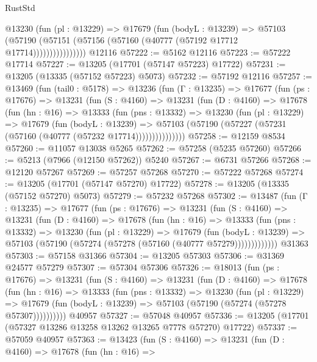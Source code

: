\begin{lexlean}{RustStd}
\begin{coremodule}
                  @13230
                    (fun (pl : @13229) =>
                    @17679
                      (fun (bodyL : @13239) =>
                      @57103
                        (@57190
                          (@57151 (@57156 (@57160 (@40777 (@57192 @17712 @17714))))))))))))))))
    @12116
@57222 := @5162 @12116
@57223 := @57222 @17714
@57227 := @13205 (@17701 (@57147 @57223) @17722)
@57231 := @13205 (@13335 (@57152 @57223) @5073)
@57232 := @57192 @12116
@57257 := @13469
    (fun (tail0 : @5178) =>
    @13236
      (fun (Γ : @13235) =>
      @17677
        (fun (ps : @17676) =>
        @13231
          (fun (S : @4160) =>
          @13231
            (fun (D : @4160) =>
            @17678
              (fun (hn : @16) =>
              @13333
                (fun (pns : @13332) =>
                @13230
                  (fun (pl : @13229) =>
                  @17679
                    (fun (bodyL : @13239) =>
                    @57103 (@57190 (@57227 (@57231 (@57160 (@40777 (@57232 @17714)))))))))))))))
@57258 := @12159 @8534
@57260 := @11057 @13038 @5265
@57262 := @57258 (@5235 @57260)
@57266 := @5213 (@7966 (@12150 @57262)) @5240
@57267 := @6731 @57266
@57268 := @12120 @57267
@57269 := @57257 @57268
@57270 := @57222 @57268
@57274 := @13205 (@17701 (@57147 @57270) @17722)
@57278 := @13205 (@13335 (@57152 @57270) @5073)
@57279 := @57232 @57268
@57302 := @13487
    (fun (Γ : @13235) =>
    @17677
      (fun (ps : @17676) =>
      @13231
        (fun (S : @4160) =>
        @13231
          (fun (D : @4160) =>
          @17678
            (fun (hn : @16) =>
            @13333
              (fun (pns : @13332) =>
              @13230
                (fun (pl : @13229) =>
                @17679
                  (fun (bodyL : @13239) =>
                  @57103 (@57190 (@57274 (@57278 (@57160 (@40777 @57279)))))))))))))
    @31363
@57303 := @57158 @31366
@57304 := @13205 @57303
@57306 := @31369 @24577 @57279
@57307 := @57304 @57306
@57326 := @18013
    (fun (ps : @17676) =>
    @13231
      (fun (S : @4160) =>
      @13231
        (fun (D : @4160) =>
        @17678
          (fun (hn : @16) =>
          @13333
            (fun (pns : @13332) =>
            @13230
              (fun (pl : @13229) =>
              @17679 (fun (bodyL : @13239) => @57103 (@57190 (@57274 (@57278 @57307))))))))))
    @40957
@57327 := @57048 @40957
@57336 := @13205 (@17701 (@57327 @13286 @13258 @13262 @13265 @7778 @57270) @17722)
@57337 := @57059 @40957
@57363 := @13423
    (fun (S : @4160) =>
    @13231
      (fun (D : @4160) =>
      @17678
        (fun (hn : @16) =>

\end{coremodule}
\end{lexlean}
